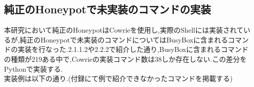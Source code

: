 \subsection{純正のHoneypotで未実装のコマンドの実装}
\label{implementation:ImplBusyBox}
本研究において純正のHoneypotはCowrie\cite{cowrie}を使用し,実際のShellには実装されているが,純正のHoneypotで未実装のコマンドについてはBusyBox\cite{busybox}に含まれるコマンドの実装を行なった.2.1.1.2や2.2.2で紹介した通り,BusyBoxに含まれるコマンドの種類が219ある中で,Cowrieの実装コマンド数は38しか存在しない.この差分をPythonで実装する.\\
実装例は以下の通り.(付録にて例で紹介できなかったコマンドを掲載する)\\


